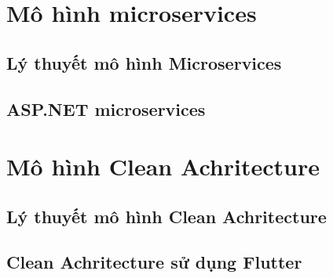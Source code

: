 \section{Mô hình microservices}
\subsection{Lý thuyết mô hình Microservices}
\subsection{ASP.NET microservices}
\section{Mô hình Clean Achritecture}
\subsection{Lý thuyết mô hình Clean Achritecture}
\subsection{Clean Achritecture sử dụng Flutter}
